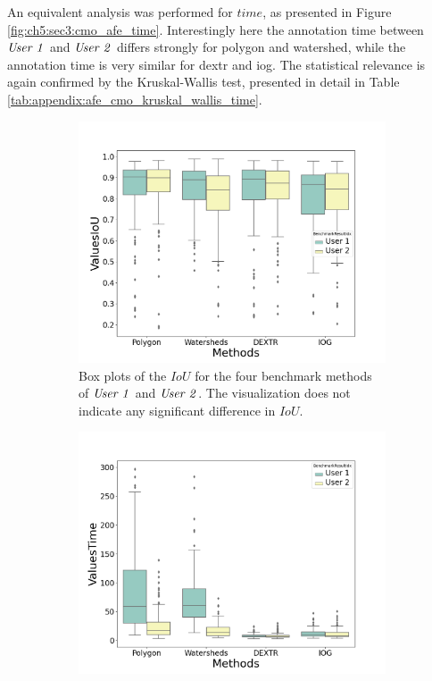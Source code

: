 An equivalent analysis was performed for $ time $, as presented in Figure \ref{fig:ch5:sec3:cmo_afe_time}.
Interestingly here the annotation time between $ \textnormal{\textit{User 1}} $ and $ \textnormal{\textit{User 2}} $ differs strongly for polygon and watershed, while the annotation time is very similar for \gls{dextr} and \gls{iog}.
The statistical relevance is again confirmed by the Kruskal-Wallis test, presented in detail in Table \ref{tab:appendix:afe_cmo_kruskal_wallis_time}.

\begin{figure} [h!]
 	\centering
 	\begin{subfigure}[t]{0.45\textwidth}
 		\centering
 		\includegraphics[width=\textwidth]{figures/chap53_afe_cmo_iou.png}
 		\caption{
 			Box plots of the $ IoU $ for the four benchmark methods of $ \textnormal{\textit{User 1}} $ and $ \textnormal{\textit{User 2}} $.
 			The visualization does not indicate any significant difference in $ IoU $.
 		} \label{fig:ch5:sec3:cmo_afe_iou}
 	\end{subfigure}
 	\hfill
 	\begin{subfigure}[t]{0.45\textwidth}
 		\centering
 		\includegraphics[width=\textwidth]{figures/chap53_afe_cmo_time.png}

\end{subfigure}
\end{figure}
